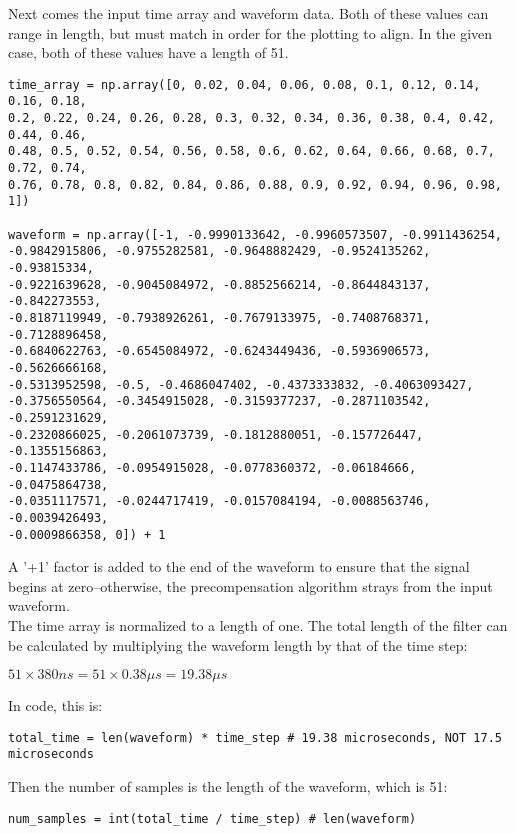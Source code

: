 Next comes the input time array and waveform data. Both of these values can range in length, but must match in order for the plotting to align. In the given case, both of these values have a length of 51.

\begin{verbatim}
time_array = np.array([0, 0.02, 0.04, 0.06, 0.08, 0.1, 0.12, 0.14, 0.16, 0.18,
0.2, 0.22, 0.24, 0.26, 0.28, 0.3, 0.32, 0.34, 0.36, 0.38, 0.4, 0.42, 0.44, 0.46, 
0.48, 0.5, 0.52, 0.54, 0.56, 0.58, 0.6, 0.62, 0.64, 0.66, 0.68, 0.7, 0.72, 0.74, 
0.76, 0.78, 0.8, 0.82, 0.84, 0.86, 0.88, 0.9, 0.92, 0.94, 0.96, 0.98, 1])

waveform = np.array([-1, -0.9990133642, -0.9960573507, -0.9911436254, 
-0.9842915806, -0.9755282581, -0.9648882429, -0.9524135262, -0.93815334, 
-0.9221639628, -0.9045084972, -0.8852566214, -0.8644843137, -0.842273553, 
-0.8187119949, -0.7938926261, -0.7679133975, -0.7408768371, -0.7128896458, 
-0.6840622763, -0.6545084972, -0.6243449436, -0.5936906573, -0.5626666168, 
-0.5313952598, -0.5, -0.4686047402, -0.4373333832, -0.4063093427, 
-0.3756550564, -0.3454915028, -0.3159377237, -0.2871103542, -0.2591231629, 
-0.2320866025, -0.2061073739, -0.1812880051, -0.157726447, -0.1355156863, 
-0.1147433786, -0.0954915028, -0.0778360372, -0.06184666, -0.0475864738, 
-0.0351117571, -0.0244717419, -0.0157084194, -0.0088563746, -0.0039426493, 
-0.0009866358, 0]) + 1
\end{verbatim}

A '+1' factor is added to the end of the waveform to ensure that the signal begins at zero--otherwise, the precompensation algorithm strays from the input waveform.
\\
The time array is normalized to a length of one. The total length of the filter can be calculated by multiplying the waveform length by that of the time step:

\begin{center}
    $51 \times 380ns = 51 \times 0.38 \mu s = 19.38 \mu s$
\end{center}

In code, this is:

\begin{verbatim}
total_time = len(waveform) * time_step # 19.38 microseconds, NOT 17.5 microseconds
\end{verbatim}

Then the number of samples is the length of the waveform, which is 51:

\begin{verbatim}
num_samples = int(total_time / time_step) # len(waveform)
\end{verbatim}

